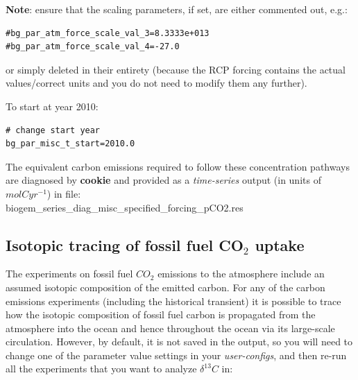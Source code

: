 \vspace{1mm}

\noindent \textbf{Note}: ensure that the scaling parameters, if set, are either commented out, e.g.:
\vspace{-2pt}\small\begin{verbatim}
#bg_par_atm_force_scale_val_3=8.3333e+013
#bg_par_atm_force_scale_val_4=-27.0
\end{verbatim}\normalsize\vspace{-2pt}
\noindent or simply deleted in their entirety (because the RCP forcing contains the actual values/correct units and you do not need to modify them any further).

\vspace{1mm}
To start at year 2010:
\vspace{-1mm}\small\begin{verbatim}
# change start year
bg_par_misc_t_start=2010.0
\end{verbatim}\normalsize\vspace{-1mm}

\vspace{1mm}
The equivalent carbon emissions required to follow these concentration pathways are diagnosed by \textbf{cookie} and provided as a \textit{time-series} output (in units of \(mol C yr^{-1}\)) in file: 
\vspace{1mm}
\\\textsf{\footnotesize biogem\_series\_diag\_misc\_specified\_forcing\_pCO2.res}

\newpage

\subsection{Isotopic tracing of fossil fuel CO$_{2}$ uptake}

\noindent The  experiments on fossil fuel \(CO_{2}\) emissions to the atmosphere include an assumed isotopic composition of the emitted carbon. For any of the carbon emissions experiments (including the historical transient) it is possible to trace how the isotopic composition of fossil fuel carbon is propagated from the atmosphere into the ocean and hence throughout the ocean via its large-scale circulation. However, by default, it is not saved in the output, so you will need to change one of the parameter value settings in your \textit{user-configs}, and then re-run all the experiments that you want to analyze \(\delta^{13}C\) in:

